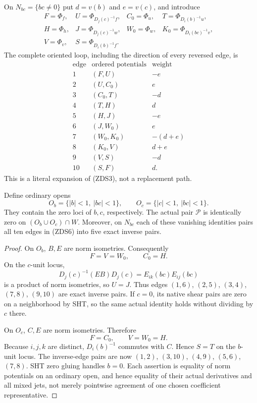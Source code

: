 On $N_{bc}=\{bc\ne0\}$ put $d=v(b)$ and $e=v(c)$, and introduce
\[
 \begin{array}{llll}
 F=\Phi_f,& U=\Phi_{D_j(c)^{-1}f},& C_0=\Phi_u,
   & T=\Phi_{D_i(b)^{-1}u},\\
 H=\Phi_h,& J=\Phi_{D_j(c)^{-1}w},& W_0=\Phi_w,
   & K_0=\Phi_{D_i(bc)^{-1}v},\\
 V=\Phi_v,& S=\Phi_{D_i(b)^{-1}f}.&&
 \end{array}
 \tag{ZDS5}
\]
The complete oriented loop, including the direction of every reversed
edge, is
\[
\begin{array}{c|c|c}
\text{edge}&\text{ordered potentials}&\text{weight}\\\hline
1&(F,U)&-e\\
2&(U,C_0)&e\\
3&(C_0,T)&-d\\
4&(T,H)&d\\
5&(H,J)&-e\\
6&(J,W_0)&e\\
7&(W_0,K_0)&-(d+e)\\
8&(K_0,V)&d+e\\
9&(V,S)&-d\\
10&(S,F)&d.
\end{array}
\tag{ZDS6}
\]
This is a literal expansion of (ZDS3), not a replacement path.

\begin{lemma}
Define ordinary opens
\[
 O_b=\{|b|<1,\ |bc|<1\},\qquad
 O_c=\{|c|<1,\ |bc|<1\}.
 \tag{ZDS7}
\]
They contain the zero loci of $b,c$, respectively.  The actual pair
$\mathscr P$ is identically zero on $(O_b\cup O_c)\cap W$.
Moreover, on $N_{bc}$ each of these vanishing identities pairs all
ten edges in (ZDS6) into five exact inverse pairs.
\end{lemma}

\begin{proof}
On $O_b$, $B,E$ are norm isometries.  Consequently
\[
 F=V=W_0,\qquad C_0=H.
 \tag{ZDS8}
\]
On the $c$-unit locus,
\[
 D_j(c)^{-1}(EB)D_j(c)
       =E_{ik}(bc)E_{ij}(bc)
 \tag{ZDS9}
\]
is a product of norm isometries, so $U=J$.  Thus edges $(1,6)$,
$(2,5)$, $(3,4)$, $(7,8)$, $(9,10)$ are exact inverse pairs.
If $c=0$, its native shear pairs are zero on a neighborhood by SHT,
so the same actual identity holds without dividing by $c$ there.

On $O_c$, $C,E$ are norm isometries.  Therefore
\[
 F=C_0,\qquad V=W_0=H.
 \tag{ZDS10}
\]
Because $i,j,k$ are distinct, $D_i(b)^{-1}$ commutes with $C$.
Hence $S=T$ on the $b$-unit locus.  The inverse-edge pairs are now
$(1,2)$, $(3,10)$, $(4,9)$, $(5,6)$, $(7,8)$.
SHT zero gluing handles $b=0$.  Each assertion is equality of
norm potentials on an ordinary open, and hence equality of their
actual derivatives and all mixed jets, not merely pointwise
agreement of one chosen coefficient representative.
\end{proof}


